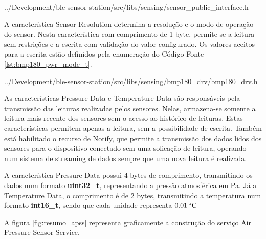 \begin{minipage}{0.95\linewidth}

{../Development/ble-sensor-station/src/libs/sensing/sensor_public_interface.h}
\end{minipage}

A característica Sensor Resolution determina a resolução e o modo de operação do
sensor. Nesta característica com comprimento de 1 byte, permite-se a leitura sem
restrições e a escrita com validação do valor configurado. Os valores aceitos
para a escrita estão definidos pela enumeração do Código Fonte \ref{lst:bmp180_pwr_mode_t}.
\cite{BMP180Datasheet}

\begin{minipage}{0.95\linewidth}

{../Development/ble-sensor-station/src/libs/sensing/bmp180_drv/bmp180_drv.h}
\end{minipage}

As características Pressure Data e Temperature Data são responsáveis pela
transmissão das leituras realizadas pelos sensores. Nelas, armazena-se somente a
leitura mais recente dos sensores sem o acesso ao histórico de leituras. Estas
características permitem apenas a leitura, sem a possibilidade de escrita.
Também está habilitado o recurso de Notify, que permite a transmissão dos
dados lidos dos sensores para o dispositivo conectado sem uma solicação de
leitura, operando num sistema de streaming de dados sempre que uma nova leitura
é realizada.

A característica Pressure Data possui 4 bytes de comprimento, transmitindo os
dados num formato \textbf{uint32\_t}, representando a pressão atmosférica em Pa.
Já a Temperature Data, o comprimento é de 2 bytes, transmitindo a temperatura
num formato \textbf{int16\_t}, sendo que cada unidade representa
$0.01\,^{\circ}{\rm C}$ 

A figura \ref{fig:resumo_apss} representa graficamente a construção do serviço
Air Pressure Sensor Service.


